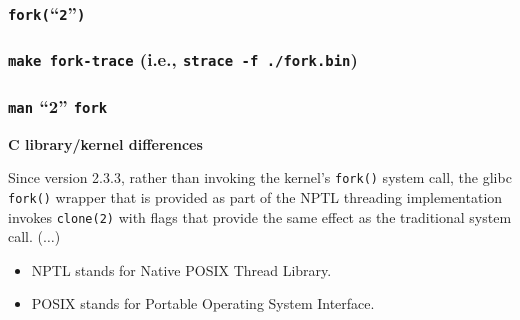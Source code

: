\begin{frame}[fragile]

\frametitle{\texttt{fork(}``\texttt{2}''\texttt{)}}

\footnotesize



\end{frame}


\begin{frame}[fragile]

\frametitle{\texttt{make fork-trace} (i.e., \texttt{strace -f ./fork.bin})}

\footnotesize



\end{frame}


\begin{frame}[fragile]

\frametitle{\texttt{man} ``2'' \texttt{fork}}

\footnotesize

\begin{manblock}

\textbf{C library/kernel differences}

\medskip

Since  version  2.3.3,  rather  than invoking the kernel's \texttt{fork()}
system call, the glibc \texttt{fork()} wrapper that is provided as part of the
NPTL threading implementation invokes \texttt{clone(2)} with flags that provide
the same effect as the traditional system call. ($\ldots$)

\end{manblock}


\begin{itemize}

\item NPTL stands for Native POSIX Thread Library.

\item POSIX stands for Portable Operating System Interface.

\end{itemize}

\end{frame}
